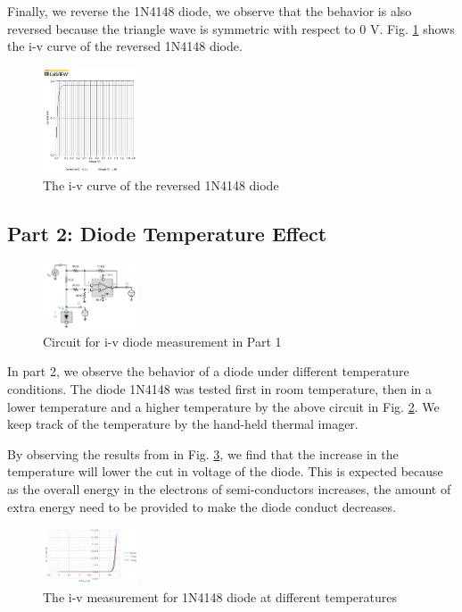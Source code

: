 \documentclass[letterpaper, 10 pt, conference]{ieeeconf}  %
\begin{document}
\par Finally, we reverse the 1N4148 diode, we observe that the behavior is also reversed because the triangle wave is symmetric with respect to 0 V. Fig. \ref{fig:7} shows the i-v curve of the reversed 1N4148 diode.
\begin{figure}[ht]
  \centering
  \includegraphics[width=0.25\textwidth]{images/result6.png}
  \caption{The i-v curve of the reversed 1N4148 diode}
  \label{fig:7}
\end{figure}
\clearpage
\subsection{Part 2: Diode Temperature Effect}
\begin{figure}[ht]
  \centering
  \includegraphics[width=0.25\textwidth]{images/Part1circuit.png}
  \caption{Circuit for i-v diode measurement in Part 1}
  \label{fig:8}
\end{figure}
In part 2, we observe the behavior of a diode under different temperature conditions. The diode 1N4148 was tested first in room temperature, then in a lower temperature and a higher temperature by the above circuit in Fig. \ref{fig:8}. We keep track of the temperature by the hand-held thermal imager.
\par By observing the results from in Fig. \ref{fig:9}, we find that the increase in the temperature will lower the cut in voltage of the diode. This is expected because as the overall energy in the electrons of semi-conductors increases, the amount of extra energy need to be provided to make the diode conduct decreases.\newline
\begin{figure}[ht]
  \centering
  \includegraphics[width=0.25\textwidth]{images/result7.png}
  \caption{The i-v measurement for 1N4148 diode at different temperatures}
  \label{fig:9}
\end{figure}
\end{document}
